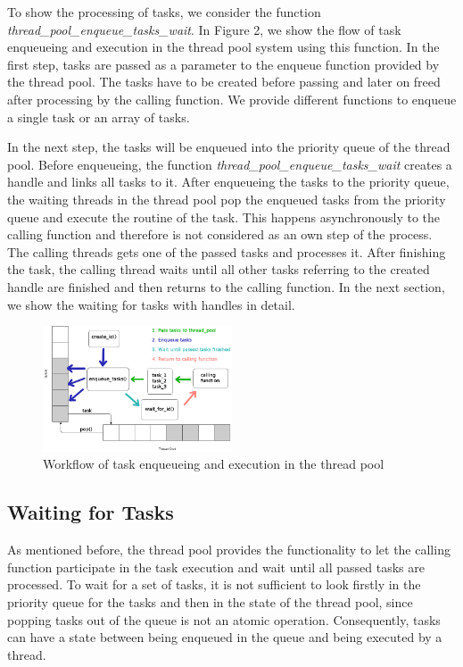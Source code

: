 \documentclass[conference]{IEEEtran}
\begin{document}
To show the processing of tasks, we consider the function \emph{thread\_pool\_enqueue\_tasks\_wait}. In Figure 2, we show the flow of task enqueueing and execution in the thread pool system using this function. In the first step, tasks are passed as a parameter to the enqueue function provided by the thread pool. The tasks have to be created before passing and later on freed after processing by the calling function.  We provide different functions to enqueue a single task or an array of tasks. 

In the next step, the tasks will be enqueued into the priority queue of the thread pool. Before enqueueing, the function \emph{thread\_pool\_enqueue\_tasks\_wait} creates a handle and links all tasks to it. After enqueueing the tasks to the priority queue, the waiting threads in the thread pool pop the enqueued tasks from the priority queue and execute the routine of the task. This happens asynchronously to the calling function and therefore is not considered as an own step of the process. The calling threads gets one of the passed tasks and processes it. After finishing the task, the calling thread waits until all other tasks referring to the created handle are finished and then returns to the calling function. In the next section, we show the waiting for tasks with handles in detail.

\begin{figure}
	\includegraphics[width=0.5\textwidth]{img/pool_queue.png}
	\caption{Workflow of task enqueueing and execution in the thread pool}
	\label{fig1}
\end{figure}

\subsection{Waiting for Tasks}
As mentioned before, the thread pool provides the functionality to let the calling function participate in the task execution and wait until all passed tasks are processed. To wait for a set of tasks, it is not sufficient to look firstly in the priority queue for the tasks and then in the state of the thread pool, since popping tasks out of the queue is not an atomic operation. Consequently, tasks can have a state between being enqueued in the queue and being executed by a thread. 
\end{document}
